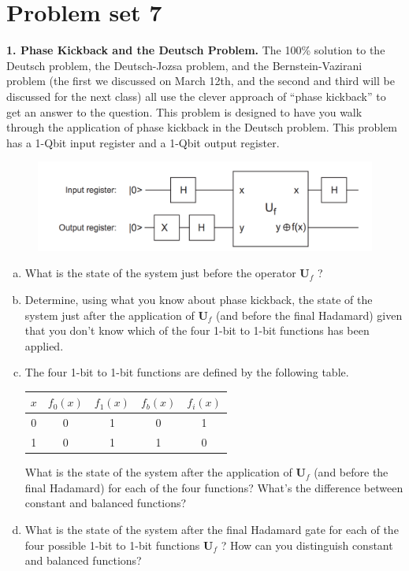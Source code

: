 \documentclass{book}
\theoremstyle{definition}
\newcommand{\U}{\mathbf{U}}
\begin{document}
\newpage



\section{Problem set 7}



\noindent \textbf{1. Phase Kickback and the Deutsch Problem.}  The 100\% solution to the Deutsch problem,
the Deutsch-Jozsa problem, and the Bernstein-Vazirani problem (the first we discussed on
March 12th, and the second and third will be discussed for the next class) all use the clever
approach of ``phase kickback'' to get an answer to the question. This problem is designed
to have you walk through the application of phase kickback in the Deutsch problem. This
problem has a 1-Qbit input register and a 1-Qbit output register.
\begin{figure}[!htb]
	\centering
	\includegraphics[scale=0.25]{phase1}
\end{figure}
\begin{enumerate}[(a)]
	\item What is the state of the system just before the operator $\U_f$ ?
	
	\item Determine, using what you know about phase kickback, the state of the system just after
	the application of $\U_f$ (and before the final Hadamard) given that you don't know which
	of the four 1-bit to 1-bit functions has been applied.
	\item The four 1-bit to 1-bit functions are defined by the following table.
	
	\begin{center}
	\begin{tabular}{|c|c|c|c|c|}
		\hline
		$x$ & $f_0(x)$ & $f_1(x)$ & $f_b(x)$ & $f_i(x)$ \\
		\hline
		0 & 0 & 1 & 0 & 1\\
		\hline
		1 & 0 & 1 & 1 & 0\\
		\hline
	\end{tabular}
	\end{center}
	What is the state of the system after the application of $\U_f$ (and before the final
	Hadamard) for each of the four functions? What's the difference between constant
	and balanced functions?
	
	\item  What is the state of the system after the final Hadamard gate for each of the four possible
	1-bit to 1-bit functions $\U_f$ ? How can you distinguish constant and balanced functions?
\end{enumerate}
\end{document}
